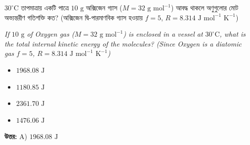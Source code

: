 \documentclass[12pt, a4paper]{article}
\begin{document}
\begin{tcolorbox}[questionbox={প্রশ্ন (Question) 9}]
    \noindent
    $30^\circ\text{C}$ তাপমাত্রায় একটি পাত্রে $10\text{ g}$ অক্সিজেন গ্যাস ($M = 32\text{ g mol}^{-1}$) আবদ্ধ থাকলে অণুগুলোর মোট অভ্যন্তরীণ গতিশক্তি কত? (অক্সিজেন দ্বি-পারমাণবিক গ্যাস হওয়ায় $f = 5$, $R = 8.314\text{ J mol}^{-1}\text{ K}^{-1}$)
    
    \vspace{0.8em}
    \begin{english}
    \noindent\textit{\color{darkgray}
    If $10\text{ g}$ of Oxygen gas ($M = 32\text{ g mol}^{-1}$) is enclosed in a vessel at $30^\circ\text{C}$, what is the total internal kinetic energy of the molecules? (Since Oxygen is a diatomic gas $f = 5$, $R = 8.314\text{ J mol}^{-1}\text{ K}^{-1}$)
    }
    \end{english}
\end{tcolorbox}

\begin{itemize}[label={}, leftmargin=1cm, itemsep=0.5em]
    \item[\textbf{A)}] $1968.08\text{ J}$
    \item[\textbf{B)}] $1180.85\text{ J}$
    \item[\textbf{C)}] $2361.70\text{ J}$
    \item[\textbf{D)}] $1476.06\text{ J}$
\end{itemize}

\vspace{0.5em}
\begin{tcolorbox}[answerbox]
    \textbf{\color{success} উত্তর:} A) $1968.08\text{ J}$
\end{tcolorbox}
\vspace{1em}
\end{document}
